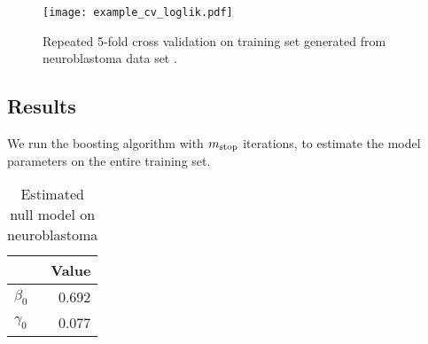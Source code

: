 \begin{figure}
\caption{Repeated 5-fold cross validation on training set generated from neuroblastoma data set \citep{oberthuer-data}.}
\label{fig:neuroblastoma-cv}
\centering\texttt{[image: example\_cv\_loglik.pdf]}
\end{figure}

\subsection{Results}
We run the boosting algorithm with $m_{\text{stop}}$ iterations, to estimate the model parameters on the entire training set.

\begin{table}
\caption{Estimated null model on neuroblastoma \citep{oberthuer-data}}
\label{tab:neuroblastoma-intercepts}
\centering
\begin{tabular}{lr}
\toprule
  & Value\\
\hline
$\beta_0$ & 0.692 \\
$\gamma_0$ & 0.077 \\
\bottomrule
\end{tabular}
\end{table}

